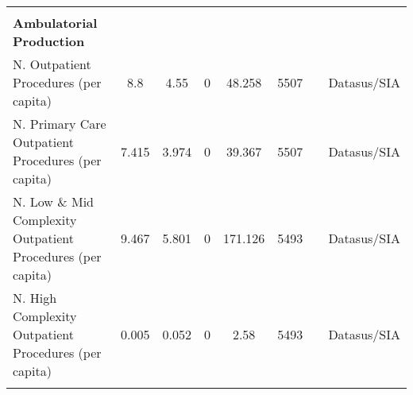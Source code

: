 \begin{table}[H]
\begin{footnotesize}
\begin{center}
{\begin{threeparttable}[b]
\begin{tabular}{rrrrrrrr}
          &       &       &       &       &       &       &  \\
    \multicolumn{1}{l}{\textbf{Ambulatorial Production}} &       &       &       &       &       &       &  \\
    \multicolumn{1}{l}{N. Outpatient Procedures (per capita)} & \multicolumn{1}{c}{8.8} & \multicolumn{1}{c}{4.55} & \multicolumn{1}{c}{0} & \multicolumn{1}{c}{48.258} & \multicolumn{1}{c}{5507} &       & \multicolumn{1}{c}{Datasus/SIA} \\
    \multicolumn{1}{l}{N. Primary Care Outpatient Procedures (per capita)} & \multicolumn{1}{c}{7.415} & \multicolumn{1}{c}{3.974} & \multicolumn{1}{c}{0} & \multicolumn{1}{c}{39.367} & \multicolumn{1}{c}{5507} &       & \multicolumn{1}{c}{Datasus/SIA} \\
    \multicolumn{1}{l}{N. Low \& Mid Complexity Outpatient Procedures (per capita)} & \multicolumn{1}{c}{9.467} & \multicolumn{1}{c}{5.801} & \multicolumn{1}{c}{0} & \multicolumn{1}{c}{171.126} & \multicolumn{1}{c}{5493} &       & \multicolumn{1}{c}{Datasus/SIA} \\
    \multicolumn{1}{l}{N. High Complexity Outpatient Procedures (per capita)} & \multicolumn{1}{c}{0.005} & \multicolumn{1}{c}{0.052} & \multicolumn{1}{c}{0} & \multicolumn{1}{c}{2.58} & \multicolumn{1}{c}{5493} &       & \multicolumn{1}{c}{Datasus/SIA} \\
          &       &       &       &       &       &       &  \\
    \bottomrule
    \bottomrule
    \end{tabular}%
    



\end{threeparttable}
}
\end{center}
\end{footnotesize}
\end{table}